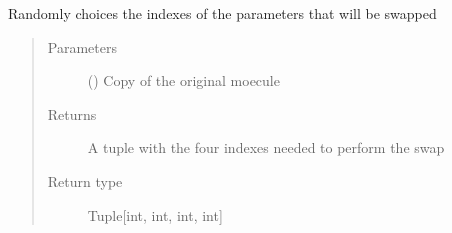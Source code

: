 \documentclass[letterpaper,10pt,english]{sphinxmanual}
\begin{document}
\begin{fulllineitems}
\label{\detokenize{MolOpt.molecular:MolOpt.molecular.molecular._get_swap_indexes}}
\sphinxAtStartPar
Randomly choices the indexes of the parameters that will be swapped
\begin{quote}\begin{description}
\item[{Parameters}] \leavevmode
\sphinxAtStartPar
{} ({\hyperref[\detokenize{MolOpt.molecular:MolOpt.molecular.molecular.Molecule}]{}}) \textendash{} Copy of the original moecule

\item[{Returns}] \leavevmode
\sphinxAtStartPar
A tuple with the four indexes needed to perform the swap

\item[{Return type}] \leavevmode
\sphinxAtStartPar
Tuple{[}int, int, int, int{]}

\end{description}\end{quote}

\end{fulllineitems}

\end{document}
